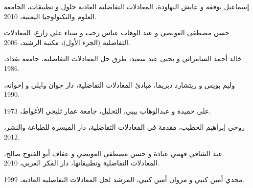 \documentclass{arabicClass}
\begin{document}
	
	
	\belowdisplayskip=7pt
	\abovedisplayskip=7pt
	\renewcommand{\jot}{10pt}
	
	
	
	
	
	
	\tableofcontents
	
	
		\clearpage
	
	\setcounter{chapter}{1}
	
	
	
	
	\begin{thebibliography}{9}
		إسماعيل بوقفة و عايش النهاودة،  
		المعادلات التفاضلية العادية حلول و تطبيقات،  
		الجامعة العلوم والتكنولوجيا اليمنية، 2010.
		
		حسن مصطفى العويضي و عبد الوهاب عباس رجب و سناء علي زارع،  
		المعادلات التفاضلية (الجزء الأول)،  
		مكتبة الرشيد، 2006.
		
		خالد أحمد السامرائي و يحيى عبد سعيد،  
		طرق حل المعادلات التفاضلية،  
		جامعة بغداد، 1986.
		
		وليم بويس و ريتشارد دبريما،  
		مبادئ المعادلات التفاضلية،  
		دار جوان وايلي و إخوانه، 1990.
		
		علي حميدة و عبدالوهاب بيبي،  
		التحليل،  
		جامعة عمار ثليجي الأغواط، 1973.
		
		روحي إبراهيم الخطيب،  
		مقدمة في المعادلات التفاضلية،  
		دار الميسرة للطباعة والنشر، 2012.
		
		عبد الشافي فهمي عبادة و حسن مصطفى العويضي و عفاف أبو الفتوح صالح،  
		المعادلات التفاضلية وتطبيقاتها،  
		دار الفكر العربي، 2010.
		
		مجدي أمين كتبي و مروان أمين كتبي،  
		المرشد لحل المعادلات التفاضلية العادية،  
		1999.
		
	\end{thebibliography}
	
\end{document}
